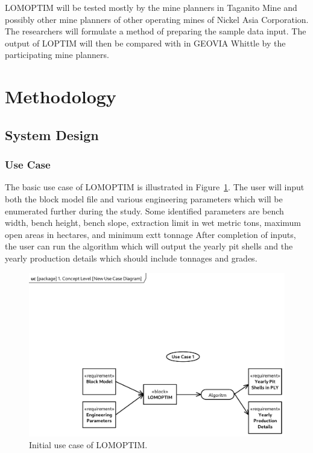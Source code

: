 \documentclass[12pt]{report}
\begin{document}
LOMOPTIM will be tested mostly by the mine planners in Taganito Mine and possibly other mine planners of other operating mines of Nickel Asia Corporation.
The researchers will formulate a method of preparing the sample data input.
The output of LOPTIM will then be compared with in GEOVIA Whittle by the participating mine planners.

\section{Methodology}

\subsection{System Design}

\subsubsection{Use Case}

The basic use case \cite{usecase} of LOMOPTIM is illustrated in Figure~\ref{fig:usecase}.
The user will input both the block model file and various engineering parameters which will be enumerated further during the study.
Some identified parameters are bench width, bench height, bench slope, extraction limit in wet metric tons, maximum open areas in hectares, and minimum extt tonnage
After completion of inputs, the user can run the algorithm which will output the yearly pit shells and the yearly production details which should include tonnages and grades.

\begin{figure}[p]
    \centering
    \includegraphics[clip, trim=15mm 0 0 12mm, width=\linewidth]{img/usecase.pdf}
    \caption{Initial use case of LOMOPTIM.}
    \label{fig:usecase}
\end{figure}
\end{document}
